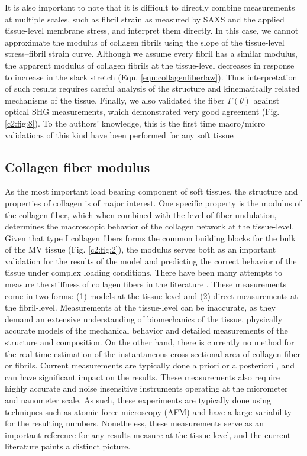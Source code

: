     
    It is also important to note that it is difficult to directly combine measurements at multiple scales, such as fibril strain as measured by SAXS and the applied tissue-level membrane stress, and interpret them directly. In this case, we cannot approximate the modulus of collagen fibrils using the slope of the tissue-level stress–fibril strain curve. Although we assume every fibril has a similar modulus, the apparent modulus of collagen fibrils at the tissue-level decreases in response to increase in the slack stretch (Eqn. \ref{eqn:collagenfiberlaw}). Thus interpretation of such results requires careful analysis of the structure and kinematically related mechanisms of the tissue. Finally, we also validated the fiber $\Gamma(\theta)$ against optical SHG measurements, which demonstrated very good agreement (Fig. \ref{c2:fig:8}). To the authors’ knowledge, this is the first time macro/micro validations of this kind have been performed for any soft tissue
    
    


\subsection{Collagen fiber modulus}

    As the most important load bearing component of soft tissues, the structure and properties of collagen is of major interest. One specific property is the modulus of the collagen fiber, which when combined with the level of fiber undulation, determines the macroscopic behavior of the collagen network at the tissue-level. Given that type I collagen fibers forms the common building blocks for the bulk of the MV tissue (Fig. \ref{c2:fig:2}), the modulus serves both as an important validation for the results of the model and predicting the correct behavior of the tissue under complex loading conditions. There have been many attempts to measure the stiffness of collagen fibers in the literature \cite{shen_stress_2008,gentleman_mechanical_2003,eppell_nano_2006,yang_mechanical_2008,yang_micromechanical_2007,wenger_mechanical_2007}. These measurements come in two forms: (1) models at the tissue-level and (2) direct measurements at the fibril-level. Measurements at the tissue-level can be inaccurate, as they demand an extensive understanding of biomechanics of the tissue, physically accurate models of the mechanical behavior and detailed measurements of the structure and composition. On the other hand, there is currently no method for the real time estimation of the instantaneous cross sectional area of collagen fiber or fibrils. Current measurements are typically done a priori \cite{gentleman_mechanical_2003} or a posteriori \cite{eppell_nano_2006}, and can have significant impact on the results. These measurements also require highly accurate and noise insensitive instruments operating at the micrometer and nanometer scale. As such, these experiments are typically done using techniques such as atomic force microscopy (AFM) and have a large variability for the resulting numbers. Nonetheless, these measurements serve as an important reference for any results measure at the tissue-level, and the current literature paints a distinct picture.



